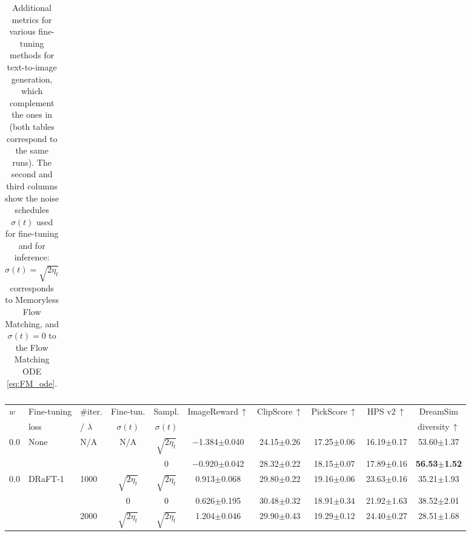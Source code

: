 \begin{table}[h!]
{\begin{tabular}{lcccccccc}
    \bottomrule
\end{tabular}
}
\caption{Additional metrics for various fine-tuning methods for text-to-image generation, which complement the ones in  (both tables correspond to the same runs). The second and third columns show the noise schedules $\sigma(t)$ used for fine-tuning and for inference: $\sigma(t) = \sqrt{2\eta_t}$ corresponds to Memoryless Flow Matching, 
and $\sigma(t) = 0$ to the Flow Matching ODE \eqref{eq:FM_ode}.
}
\label{table:metrics_multiprompt_alternative}
\end{table}

\begin{table}[h!]
\centering
{\footnotesize
\begin{tabular}{lllccccccc}
    \toprule
    \multirow{2}{*}{$w$} & Fine-tuning & $\#$iter. & Fine-tun. & Sampl.  & \multirow{2}{*}{ImageReward$\, \uparrow$} & \multirow{2}{*}{ClipScore$\, \uparrow$} & \multirow{2}{*}{PickScore$\, \uparrow$} & \multirow{2}{*}{HPS v2$\, \uparrow$} & DreamSim \\
     & loss & / $\lambda$ & $\sigma(t)$ & $\sigma(t)$ &  &  &  &  & diversity$\, \uparrow$ \\
    \midrule
    \multirow{2}{*}{0.0} & \multirow{2}{*}{None} &  \multirow{2}{*}{N/A}        & \multirow{2}{*}{N/A}          & $\sqrt{2 \eta_t}$         & $-$1.384{\tiny$\pm$0.040} & 24.15{\tiny$\pm$0.26} & 17.25{\tiny$\pm$0.06} & 16.19{\tiny$\pm$0.17} & 53.60{\tiny$\pm$1.37} \\
     &  &       &                & 0                 & $-$0.920{\tiny$\pm$0.042} & 28.32{\tiny$\pm$0.22} & 18.15{\tiny$\pm$0.07} & 17.89{\tiny$\pm$0.16} & \textbf{56.53{\tiny$\pm$1.52}}       
                                    \\
    \midrule
    \multirow{7}{*}{0.0} & \multirow{7}{*}{DRaFT-1} &  \multirow{2}{*}{1000}       & $\sqrt{2 \eta_t}$ & $\sqrt{2 \eta_t}$ & 0.913{\tiny$\pm$0.068} & 29.80{\tiny$\pm$0.22} & 19.16{\tiny$\pm$0.06} & 23.63{\tiny$\pm$0.16} & 35.21{\tiny$\pm$1.93} \\
    & &  & 0                 & 0                 & 0.626{\tiny$\pm$0.195} & 30.48{\tiny$\pm$0.32} & 18.91{\tiny$\pm$0.34} & 21.92{\tiny$\pm$1.63} & 38.52{\tiny$\pm$2.01} \\
    \addlinespace
     &  &  \multirow{2}{*}{2000}       & $\sqrt{2 \eta_t}$ & $\sqrt{2 \eta_t}$ & 1.204{\tiny$\pm$0.046} & 29.90{\tiny$\pm$0.43} & 19.29{\tiny$\pm$0.12} & 24.40{\tiny$\pm$0.27} & 28.51{\tiny$\pm$1.68} \\

\end{tabular}}
\end{table}
